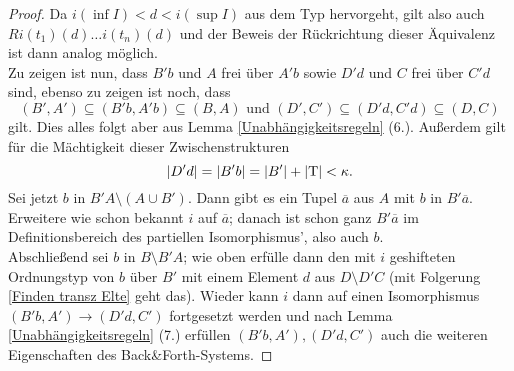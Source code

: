 \begin{proof}
	Da $i(\inf I)<d<i(\sup I)$ aus dem Typ hervorgeht, gilt also auch $Ri(t_1)(d)\dots i(t_n)(d)$ und der Beweis der Rückrichtung dieser Äquivalenz ist dann analog möglich.\\
	Zu zeigen ist nun, dass $B'b$ und $A$ frei über $A'b$ sowie $D'd$ und $C$ frei über $C'd$ sind, ebenso zu zeigen ist noch, dass $$(B',A')\subseteq(B'b,A'b)\subseteq(B,A)\text{ und }(D',C')\subseteq(D'd,C'd)\subseteq(D,C)$$ gilt. Dies alles folgt aber aus Lemma \ref{Unabhängigkeitsregeln} (6.). Außerdem gilt für die Mächtigkeit dieser Zwischenstrukturen $${\left| D'd \right|}={\left| B'b \right|}={\left| B' \right|}+{\left| \operatorname{T} \right|}<\kappa.$$
	Sei jetzt $b$ in $B'A\setminus(A\cup B')$. Dann gibt es ein Tupel $\overline{a}$ aus $A$ mit $b$ in $B'\overline{a}$. Erweitere wie schon bekannt $i$ auf $\overline{a}$; danach ist schon ganz $B'\overline{a}$ im Definitionsbereich des partiellen Isomorphismus', also auch $b$.\\
	Abschließend sei $b$ in $B\setminus B'A$;  wie oben erfülle dann den mit $i$ geshifteten Ordnungstyp von $b$ über $B'$ mit einem Element $d$ aus $D\setminus D'C$ (mit Folgerung \ref{Finden transz Elte} geht das). Wieder kann $i$ dann auf einen Isomorphismus $(B'b,A')\rightarrow(D'd,C')$ fortgesetzt werden und nach Lemma \ref{Unabhängigkeitsregeln} (7.) erfüllen $(B'b,A'),(D'd,C')$ auch die weiteren Eigenschaften des Back\&Forth-Systems.
\end{proof}

